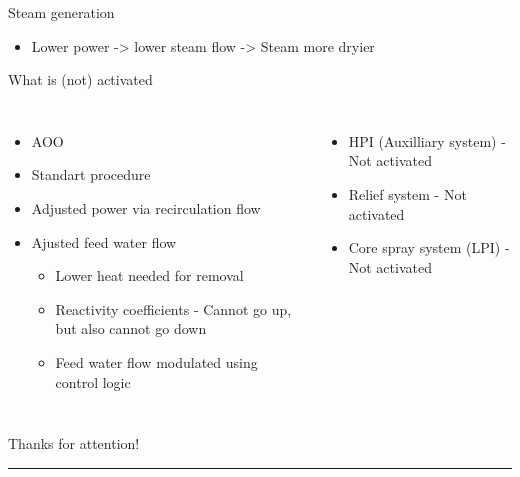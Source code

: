 \begin{frame}{Steam generation}
			\vspace{-10pt}
		\begin{itemize}
			\item Lower power -> lower steam flow -> Steam more dryier
		\end{itemize}
	\end{frame}
	
	
	

	
	
	
	
	\begin{frame}{What is (not) activated}
		\begin{columns}
		
		\begin{itemize}
			\small
		\item AOO 
		\item Standart procedure
		\item Adjusted power via recirculation flow
		\item Ajusted feed water flow 
	
		\begin{itemize}
			\item Lower heat needed for removal
			\item Reactivity coefficients - Cannot go up, but also cannot go down 
			\item Feed water flow modulated using control logic
		\end{itemize}
		\end{itemize}
		\begin{itemize}
			\item HPI (Auxilliary system) - Not activated
			\item Relief system - Not activated
			\item Core spray system (LPI) - Not activated
		\end{itemize}
	\end{columns}

	\end{frame}
	
	
	
	


	

	

	
	
	\begin{frame}
		\Large{{Thanks for attention!}}
		\vspace{0.5cm}
		\hrule
		\vspace{3cm}
	\end{frame}
	
	\nologo
	
	

